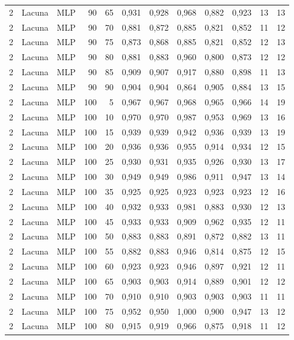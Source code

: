 \begin{longtable}{@{}rllrrrrrrrrr@{}}
2 & Lacuna & MLP & 90 & 65 & 0,931 & 0,928 & 0,968 & 0,882 & 0,923 & 13 & 13 \\
2 & Lacuna & MLP & 90 & 70 & 0,881 & 0,872 & 0,885 & 0,821 & 0,852 & 11 & 12 \\
2 & Lacuna & MLP & 90 & 75 & 0,873 & 0,868 & 0,885 & 0,821 & 0,852 & 12 & 13 \\
2 & Lacuna & MLP & 90 & 80 & 0,881 & 0,883 & 0,960 & 0,800 & 0,873 & 12 & 12 \\
2 & Lacuna & MLP & 90 & 85 & 0,909 & 0,907 & 0,917 & 0,880 & 0,898 & 11 & 13 \\
2 & Lacuna & MLP & 90 & 90 & 0,904 & 0,904 & 0,864 & 0,905 & 0,884 & 13 & 15 \\
2 & Lacuna & MLP & 100 & 5 & 0,967 & 0,967 & 0,968 & 0,965 & 0,966 & 14 & 19 \\
2 & Lacuna & MLP & 100 & 10 & 0,970 & 0,970 & 0,987 & 0,953 & 0,969 & 13 & 16 \\
2 & Lacuna & MLP & 100 & 15 & 0,939 & 0,939 & 0,942 & 0,936 & 0,939 & 13 & 19 \\
2 & Lacuna & MLP & 100 & 20 & 0,936 & 0,936 & 0,955 & 0,914 & 0,934 & 12 & 15 \\
2 & Lacuna & MLP & 100 & 25 & 0,930 & 0,931 & 0,935 & 0,926 & 0,930 & 13 & 17 \\
2 & Lacuna & MLP & 100 & 30 & 0,949 & 0,949 & 0,986 & 0,911 & 0,947 & 13 & 14 \\
2 & Lacuna & MLP & 100 & 35 & 0,925 & 0,925 & 0,923 & 0,923 & 0,923 & 12 & 16 \\
2 & Lacuna & MLP & 100 & 40 & 0,932 & 0,933 & 0,981 & 0,883 & 0,930 & 12 & 13 \\
2 & Lacuna & MLP & 100 & 45 & 0,933 & 0,933 & 0,909 & 0,962 & 0,935 & 12 & 11 \\
2 & Lacuna & MLP & 100 & 50 & 0,883 & 0,883 & 0,891 & 0,872 & 0,882 & 13 & 11 \\
2 & Lacuna & MLP & 100 & 55 & 0,882 & 0,883 & 0,946 & 0,814 & 0,875 & 12 & 15 \\
2 & Lacuna & MLP & 100 & 60 & 0,923 & 0,923 & 0,946 & 0,897 & 0,921 & 12 & 11 \\
2 & Lacuna & MLP & 100 & 65 & 0,903 & 0,903 & 0,914 & 0,889 & 0,901 & 12 & 12 \\
2 & Lacuna & MLP & 100 & 70 & 0,910 & 0,910 & 0,903 & 0,903 & 0,903 & 11 & 11 \\
2 & Lacuna & MLP & 100 & 75 & 0,952 & 0,950 & 1,000 & 0,900 & 0,947 & 13 & 12 \\
2 & Lacuna & MLP & 100 & 80 & 0,915 & 0,919 & 0,966 & 0,875 & 0,918 & 11 & 12 \\

\end{longtable}
